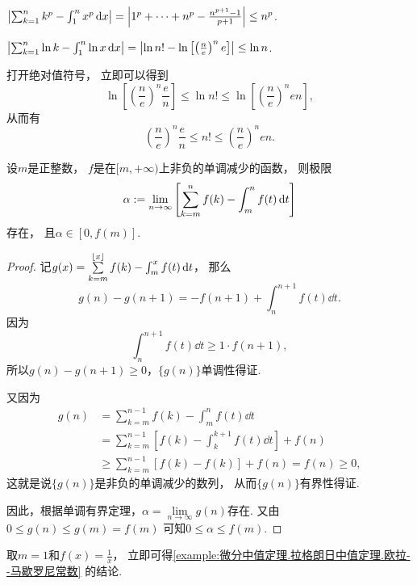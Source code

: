 \begin{example}
\(\abs{\sum_{k=1}^n k^p - \int_1^n x^p \dd{x}}
= \abs{1^p+\dotsb+n^p - \frac{n^{p+1}-1}{p+1}}
\leq n^p\).
\end{example}

\begin{example}
\(\abs{\sum_{k=1}^n \ln k - \int_1^n \ln x \dd{x}}
= \abs{\ln n! - \ln\left[\left(\frac{n}{e}\right)^n e\right]}
\leq \ln n\).
\end{example}
\begin{remark}
打开绝对值符号，
立即可以得到\[
	\ln\left[\left(\frac{n}{e}\right)^n \frac{e}{n}\right]
	\leq \ln n!
	\leq \ln\left[\left(\frac{n}{e}\right)^n e n\right],
\]
从而有\[
	\left(\frac{n}{e}\right)^n \frac{e}{n}
	\leq n!
	\leq \left(\frac{n}{e}\right)^n e n.
\]
\end{remark}

\begin{theorem}
设\(m\)是正整数，
\(f\)是在\([m,+\infty)\)上非负的单调减少的函数，
则极限\[
	\alpha
	:=
	\lim\limits_{n\to\infty} \left[
		\sum\limits_{k=m}^n f(k)
		- \int_m^n f(t) \dd{t}
	\right]
\]存在，
且\(\alpha\in[0,f(m)]\).
\begin{proof}
记\(g(x)
= \sum\limits_{k=m}^{\lfloor x\rfloor} f(k)
- \int_m^x f(t) \dd{t}\)，
那么\[
	g(n) - g(n+1)
	= -f(n+1)
	+ \int_n^{n+1} f(t) \dd{t}.
\]
因为\[
	\int_n^{n+1} f(t) \dd{t}
	\geq
	1 \cdot f(n+1),
\]
所以\(g(n) - g(n+1) \geq 0\)，\(\{g(n)\}\)单调性得证.

又因为\begin{align*}
	g(n)
	&= \sum\limits_{k=m}^{n-1} f(k) - \int_m^n f(t) \dd{t} \\
	&= \sum\limits_{k=m}^{n-1} \left[
			f(k) - \int_k^{k+1} f(t) \dd{t}
		\right] + f(n) \\
	&\geq \sum\limits_{k=m}^{n-1} [f(k) - f(k)] + f(n)
	= f(n) \geq 0,
\end{align*}
这就是说\(\{g(n)\}\)是非负的单调减少的数列，
从而\(\{g(n)\}\)有界性得证.

因此，根据单调有界定理，\(\alpha = \lim\limits_{n\to\infty} g(n)\)存在.
又由\(0 \leq g(n) \leq g(m) = f(m)\)
可知\(0 \leq \alpha \leq f(m)\).
\end{proof}
\end{theorem}
\begin{remark}
取\(m=1\)和\(f(x) = \frac1x\)，
立即可得\cref{example:微分中值定理.拉格朗日中值定理.欧拉--马歇罗尼常数} 的结论.
\end{remark}


